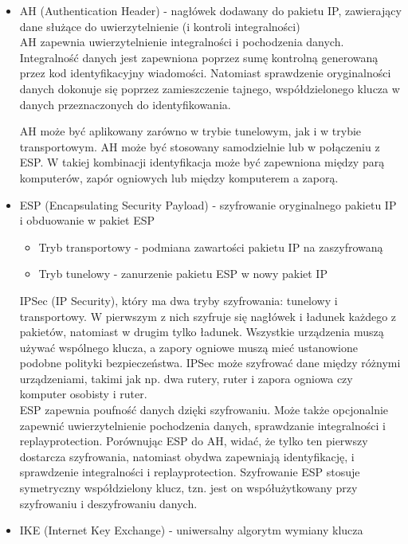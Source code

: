 \documentclass[main.tex]{subfiles}
\begin{document}
    \begin{itemize}
        \item AH (Authentication Header) - nagłówek dodawany do pakietu IP, zawierający dane służące do uwierzytelnienie (i kontroli integralności)\\
        AH zapewnia uwierzytelnienie integralności i pochodzenia danych. Integralność danych jest zapewniona poprzez sumę kontrolną generowaną przez kod identyfikacyjny wiadomości. Natomiast sprawdzenie oryginalności danych dokonuje się poprzez zamieszczenie tajnego, współdzielonego klucza w danych przeznaczonych do identyfikowania.

        AH może być aplikowany zarówno w trybie tunelowym, jak i w trybie transportowym. AH może być stosowany samodzielnie lub w połączeniu z ESP. W takiej kombinacji identyfikacja może być zapewniona między parą komputerów, zapór ogniowych lub między komputerem a zaporą.

        \item ESP (Encapsulating Security Payload) - szyfrowanie oryginalnego pakietu IP i obduowanie w pakiet ESP
        \begin{itemize}
            \item Tryb transportowy - podmiana zawartości pakietu IP na zaszyfrowaną
            \item Tryb tunelowy - zanurzenie pakietu ESP w nowy pakiet IP
        \end{itemize}
        IPSec (IP Security), który ma dwa tryby szyfrowania: tunelowy i transportowy. W pierwszym z nich szyfruje się nagłówek i ładunek każdego z pakietów, natomiast w drugim tylko ładunek. Wszystkie urządzenia muszą używać wspólnego klucza, a zapory ogniowe muszą mieć ustanowione podobne polityki bezpieczeństwa. IPSec może szyfrować dane między różnymi urządzeniami, takimi jak np. dwa rutery, ruter i zapora ogniowa czy komputer osobisty i ruter.\\

        ESP zapewnia poufność danych dzięki szyfrowaniu. Może także opcjonalnie zapewnić uwierzytelnienie pochodzenia danych, sprawdzanie integralności i replayprotection. Porównując ESP do AH, widać, że tylko ten pierwszy dostarcza szyfrowania, natomiast obydwa zapewniają identyfikację, i sprawdzenie integralności i replayprotection. Szyfrowanie ESP stosuje symetryczny współdzielony klucz, tzn. jest on współużytkowany przy szyfrowaniu i deszyfrowaniu danych.
        \item IKE (Internet Key Exchange) - uniwersalny algorytm wymiany klucza
    \end{itemize}
\end{document}
